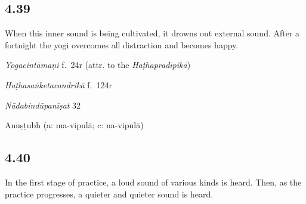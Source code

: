 \begin{ekdosis}
\subsection*{4.39}
\begin{translation}[hp04_039]
When this inner sound is being cultivated, it drowns out external sound. After a fortnight the yogi overcomes all distraction and becomes happy.
\end{translation}


\begin{testimonia}[hp04_039]
\emph{Yogacintāmaṇi} f.~24r (attr. to the \emph{Haṭhapradīpikā})
\begin{versinnote}
\end{versinnote}

\emph{Haṭhasaṅketacandrikā} f.~124r
\begin{versinnote}
\end{versinnote}

\emph{Nādabindūpaniṣat} 32
\begin{versinnote}
\end{versinnote}
\end{testimonia}


\begin{metre}[hp04_039]
Anuṣṭubh (a: ma-vipulā; c: na-vipulā)
\end{metre}

\subsection*{4.40}
\begin{translation}[hp04_040]
In the first stage of practice, a loud sound of various kinds is heard. Then, as the practice progresses, a quieter and quieter sound is heard.
\end{translation}


\end{ekdosis}
